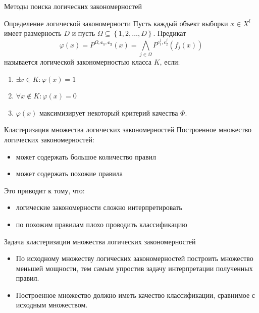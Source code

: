 \documentclass[utf8]{beamer}
\begin{document}
\begin{frame}{Методы поиска логических закономерностей}
  \begin{block}{Определение логической закономерности}
    Пусть каждый объект выборки \(x\in X^l\) имеет размерность \(D\) и
    пусть \(\Omega\subseteq\left\{1, 2, \dots, D\right\}\). Предикат
    \[
    \varphi(x) = P^{\Omega, \bm{c_1}, \bm{c_2}}(x) =
    \bigwedge_{j\in\Omega}P^{c_1^j, c_2^j}(f_j(x))
    \]
    называется логической закономерностью класса \(K\), если:
    \begin{enumerate}
    \item \(\exists x\in K\colon \varphi(x) = 1\)
    \item \(\forall x\not\in K\colon \varphi(x) = 0\)
    \item \(\varphi(x)\) максимизирует некоторый критерий качества \(\Phi\).
    \end{enumerate}
  \end{block}
\end{frame}

\begin{frame}{Кластеризация множества логических закономерностей}
  Построенное множество логических закономерностей:
  \begin{itemize}
  \item может содержать большое количество правил
  \item может содержать похожие правила
  \end{itemize}
  Это приводит к тому, что:
  \begin{itemize}
  \item логические закономерности сложно интерпретировать
  \item по похожим правилам плохо проводить классификацию
  \end{itemize}
  \begin{block}{
      Задача кластеризации множества логических закономерностей
    }
    \begin{itemize}
      \item По исходному множеству логических закономерностей
        построить множество меньшей мощности, тем самым упростив
        задачу интерпретации полученных правил.
      \item Построенное множество должно иметь качество классификации,
        сравнимое с исходным множеством.
      \end{itemize}
  \end{block}
\end{frame}
\end{document}
